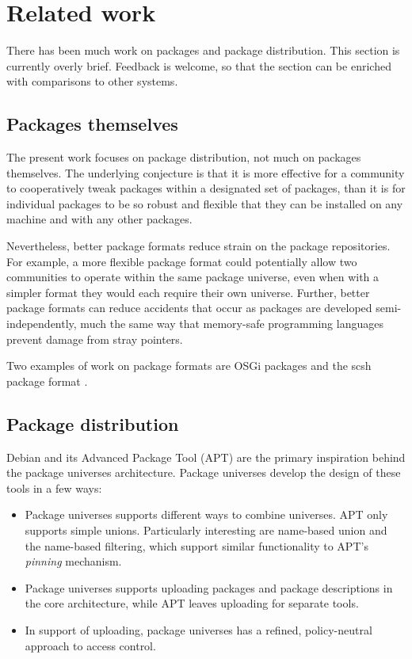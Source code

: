 \documentclass{article}
\begin{document}
\section{Related work}
There has been much work on packages and package distribution.  This
section is currently overly brief.  Feedback is welcome, so that the
section can be enriched with comparisons to other systems.


\subsection{Packages themselves}
The present work focuses on package distribution, not much on packages
themselves.  The underlying conjecture is that it is more effective
for a community to cooperatively tweak packages within a designated
set of packages, than it is for individual packages to be so robust
and flexible that they can be installed on any machine and with any
other packages.


Nevertheless, better package formats reduce strain on the package
repositories.  For example, a more flexible package format could
potentially allow two communities to operate within the same package
universe, even when with a simpler format they would each require
their own universe.  Further, better package formats can reduce
accidents that occur as packages are developed semi-independently,
much the same way that memory-safe programming languages prevent
damage from stray pointers.

Two examples of work on package formats are OSGi packages
\cite{osgi03:book, osgi:web} and the scsh package format
\cite{schinz05:scsh}.


\subsection{Package distribution}




Debian and its Advanced Package Tool (APT) \cite{apt:howto}
are the primary inspiration behind the package universes architecture.
Package universes develop the design of these tools in a few ways:
\begin{itemize}
\item Package universes supports different ways to combine universes.
      APT only supports simple unions.  Particularly interesting are
      name-based union and the name-based filtering, which support
      similar functionality to APT's \emph{pinning} mechanism.

\item Package universes supports uploading packages and package
      descriptions in the core architecture, while APT leaves
      uploading for separate tools.

\item In support of uploading, package universes has a refined,
      policy-neutral approach to access control.
\end{itemize}
\end{document}
